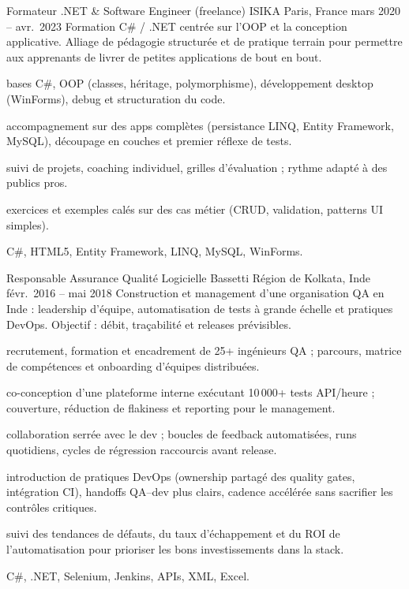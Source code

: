 \begin{cventries}
  \cventrywithintro
    {Formateur .NET \& Software Engineer (freelance)}
    {ISIKA}
    {Paris, France}
    {mars 2020 – avr.\ 2023}
    {Formation C\# / .NET centrée sur l'OOP et la conception applicative. Alliage de pédagogie structurée et de pratique terrain pour permettre aux apprenants de livrer de petites applications de bout en bout.}
    {
      \begin{cvitemsafterintro}
        \item { bases C\#, OOP (classes, héritage, polymorphisme), développement desktop (WinForms), debug et structuration du code.}
        \item { accompagnement sur des apps complètes (persistance LINQ, Entity Framework, MySQL), découpage en couches et premier réflexe de tests.}
        \item { suivi de projets, coaching individuel, grilles d'évaluation ; rythme adapté à des publics pros.}
        \item { exercices et exemples calés sur des cas métier (CRUD, validation, patterns UI simples).}
      \end{cvitemsafterintro}
    }
    {C\#, HTML5, Entity Framework, LINQ, MySQL, WinForms.}

  \cventrywithintro
    {Responsable Assurance Qualité Logicielle}
    {Bassetti}
    {Région de Kolkata, Inde}
    {févr.\ 2016 – mai 2018}
    {Construction et management d'une organisation QA en Inde : leadership d'équipe, automatisation de tests à grande échelle et pratiques DevOps. Objectif : débit, traçabilité et releases prévisibles.}
    {
      \begin{cvitemsafterintro}
        \item { recrutement, formation et encadrement de 25+ ingénieurs QA ; parcours, matrice de compétences et onboarding d'équipes distribuées.}
        \item { co-conception d'une plateforme interne exécutant 10\,000+ tests API/heure ; couverture, réduction de flakiness et reporting pour le management.}
        \item { collaboration serrée avec le dev ; boucles de feedback automatisées, runs quotidiens, cycles de régression raccourcis avant release.}
        \item { introduction de pratiques DevOps (ownership partagé des quality gates, intégration CI), handoffs QA--dev plus clairs, cadence accélérée sans sacrifier les contrôles critiques.}
        \item { suivi des tendances de défauts, du taux d'échappement et du ROI de l'automatisation pour prioriser les bons investissements dans la stack.}
      \end{cvitemsafterintro}
    }
    {C\#, .NET, Selenium, Jenkins, APIs, XML, Excel.}


\end{cventries}

